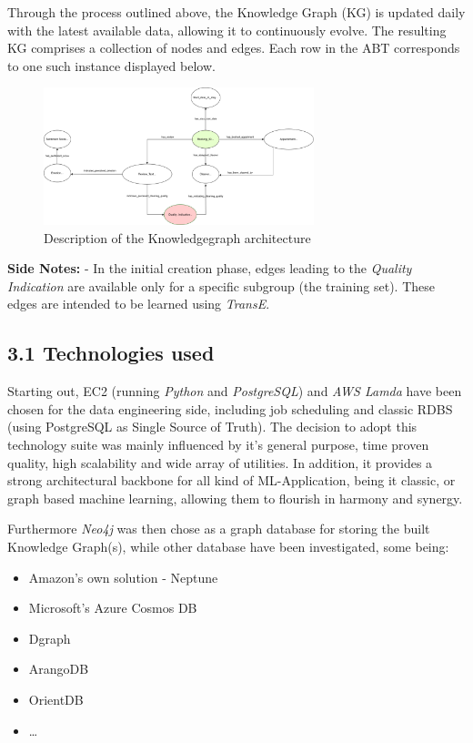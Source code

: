 \documentclass[
]{article}
\begin{document}
Through the process outlined above, the Knowledge Graph (KG) is updated
daily with the latest available data, allowing it to continuously
evolve. The resulting KG comprises a collection of nodes and edges. Each
row in the ABT corresponds to one such instance displayed below.

\begin{figure}[h]
  \centering
  \includegraphics[width=0.7\textwidth]{drawings/KG_Architecture.png}
  \caption{Description of the Knowledgegraph architecture}
\end{figure}

\textbf{Side Notes:} - In the initial creation phase, edges leading to
the \emph{Quality Indication} are available only for a specific subgroup
(the training set). These edges are intended to be learned using
\emph{TransE}.

\subsection{3.1 Technologies used}\label{technologies-used}

Starting out, EC2 (running \emph{Python} and \emph{PostgreSQL}) and
\emph{AWS Lamda} have been chosen for the data engineering side, including job
scheduling and classic RDBS (using PostgreSQL as Single Source of
Truth). The decision to adopt this technology suite was mainly
influenced by it's general purpose, time proven quality, high
scalability and wide array of utilities. In addition, it provides a
strong architectural backbone for all kind of ML-Application, being it
classic, or graph based machine learning, allowing them to flourish in
harmony and synergy.

Furthermore \emph{Neo4j} was then chose as a graph database for storing
the built Knowledge Graph(s), while other database have been
investigated, some being: 

\begin{itemize}
  \item Amazon's own solution - Neptune
  \item Microsoft's Azure Cosmos DB
  \item Dgraph
  \item ArangoDB
  \item OrientDB
  \item \ldots
\end{itemize}
\end{document}
